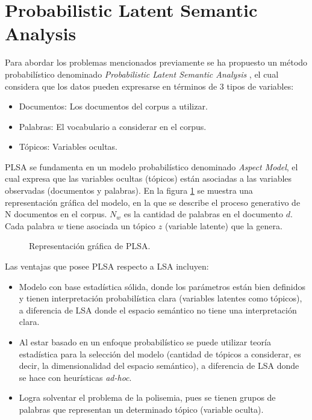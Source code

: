 \documentclass[12pt]{diicc}
\begin{document}
\section{Probabilistic Latent Semantic Analysis}

Para abordar los problemas mencionados previamente se ha propuesto un método probabilístico denominado {\em Probabilistic Latent Semantic Analysis} \cite{t41}, el cual considera que los datos pueden expresarse en términos de 3 tipos de variables:

\begin{itemize}
	\item Documentos: Los documentos del corpus a utilizar.
	\item Palabras: El vocabulario a considerar en el corpus.
	\item Tópicos: Variables ocultas.
\end{itemize}

PLSA se fundamenta en un modelo probabilístico denominado {\em Aspect Model}, el cual expresa que las variables ocultas (tópicos) están asociadas a las variables observadas (documentos y palabras). En la figura \ref{figura_plsa} se muestra una representación gráfica del modelo, en la que se describe el proceso generativo de N documentos en el corpus. $N_w$ es la cantidad de palabras en el documento $d$. Cada palabra $w$ tiene asociada un tópico $z$ (variable latente) que la genera.

\begin{figure}[!htbp]
  \begin{center}
    \leavevmode
  \end{center}
  \caption{Representación gráfica de PLSA.}
  \label{figura_plsa}
\end{figure}

Las ventajas que posee PLSA respecto a LSA incluyen:

\begin{itemize}
	\item Modelo con base estadística sólida, donde los parámetros están bien definidos y tienen interpretación probabilística clara (variables latentes como tópicos), a diferencia de LSA donde el espacio semántico no tiene una interpretación clara. 
	\item Al estar basado en un enfoque probabilístico se puede utilizar teoría estadística para la selección del modelo (cantidad de tópicos a considerar, es decir, la dimensionalidad del espacio semántico), a diferencia de LSA donde se hace con heurísticas {\em ad-hoc}.
	\item Logra solventar el problema de la polisemia, pues se tienen grupos de palabras que representan un determinado tópico (variable oculta).
\end{itemize}
\end{document}
